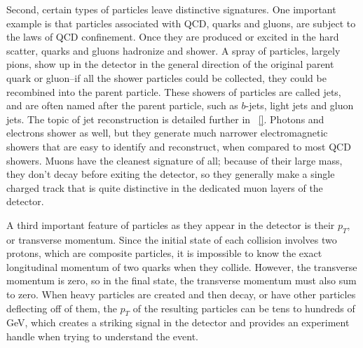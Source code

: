 Second, certain types of particles leave distinctive signatures.  One important example is that particles associated with QCD, quarks and gluons, are subject to the laws of QCD confinement.  Once they are produced or excited in the hard scatter, quarks and gluons hadronize and shower.  A spray of particles, largely pions, show up in the detector in the general direction of the original parent quark or gluon--if all the shower particles could be collected, they could be recombined into the parent particle.  These showers of particles are called jets, and are often named after the parent particle, such as $b$-jets, light jets and gluon jets.  The topic of jet reconstruction is detailed further in ~\ref{}.  Photons and electrons shower as well, but they generate much narrower electromagnetic showers that are easy to identify and reconstruct, when compared to most QCD showers.  Muons have the cleanest signature of all; because of their large mass, they don't decay before exiting the detector, so they generally make a single charged track that is quite distinctive in the dedicated muon layers of the detector.

A third important feature of particles as they appear in the detector is their $p_T$, or transverse momentum.  Since the initial state of each collision involves two protons, which are composite particles, it is impossible to know the exact longitudinal momentum of two quarks when they collide.  However, the transverse momentum is zero, so in the final state, the transverse momentum must also sum to zero.  When heavy particles are created and then decay, or have other particles deflecting off of them, the $p_T$ of the resulting particles can be tens to hundreds of GeV, which creates a striking signal in the detector and provides an experiment handle when trying to understand the event.





























